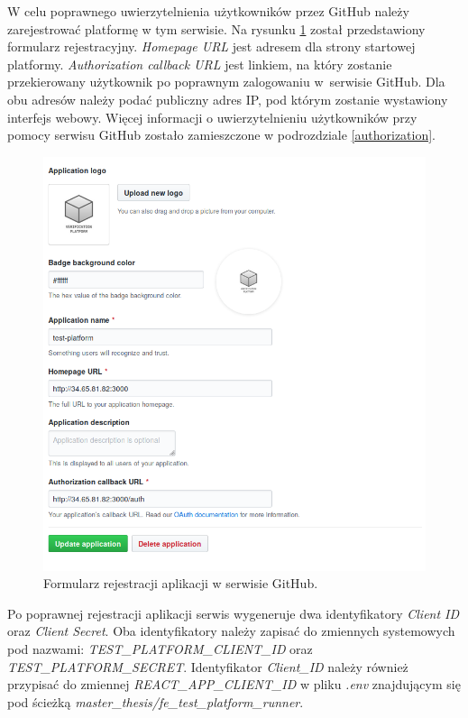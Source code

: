 W celu poprawnego uwierzytelnienia użytkowników przez GitHub należy zarejestrować platformę w tym serwisie.
Na rysunku \ref{fig:github_app_register} został przedstawiony formularz rejestracyjny.
\textit{Homepage URL} jest adresem dla strony startowej platformy.
\textit{Authorization callback URL} jest linkiem, na który zostanie przekierowany użytkownik po poprawnym zalogowaniu w~serwisie GitHub.
Dla obu adresów należy podać publiczny adres IP, pod którym zostanie wystawiony interfejs webowy.
Więcej informacji o uwierzytelnieniu użytkowników przy pomocy serwisu GitHub zostało zamieszczone w podrozdziale \ref{authorization}.

\begin{figure}[h]
    \centering
    \includegraphics[width = 12cm]{chapter05/github_app_register.png}
    \caption{Formularz rejestracji aplikacji w serwisie GitHub.}
    \label{fig:github_app_register}
\end{figure}

Po poprawnej rejestracji aplikacji serwis wygeneruje dwa identyfikatory \textit{Client ID} oraz \textit{Client Secret}.
Oba identyfikatory należy zapisać do zmiennych systemowych pod nazwami: \textit{TEST\_PLATFORM\_CLIENT\_ID} oraz \textit{TEST\_PLATFORM\_SECRET}.
Identyfikator \textit{Client\_ID} należy również przypisać do zmiennej \textit{REACT\_APP\_CLIENT\_ID} w pliku \textit{.env} znajdującym się pod ścieżką \textit{master\_thesis/fe\_test\_platform\_runner}.

